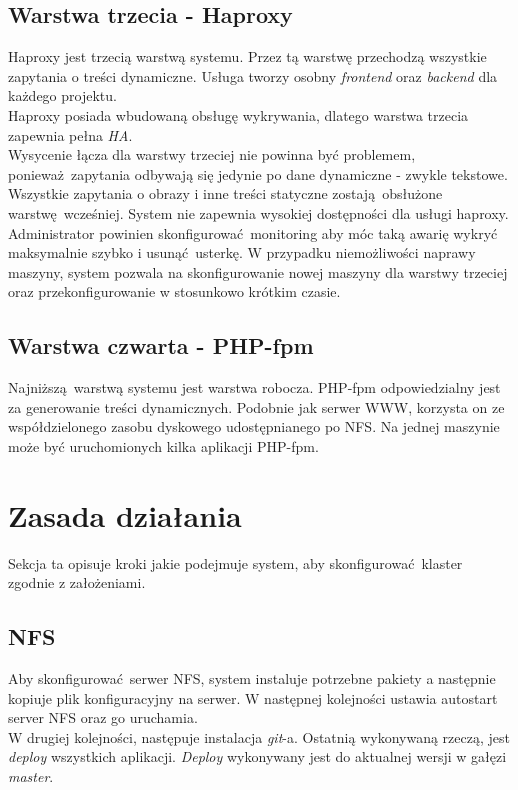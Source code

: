 \subsection{Warstwa trzecia - Haproxy}
Haproxy jest trzecią warstwą systemu.
Przez tą warstwę przechodzą wszystkie zapytania o treści dynamiczne.
Usługa tworzy osobny \textit{frontend} oraz \textit{backend} dla każdego projektu.\\
Haproxy posiada wbudowaną obsługę wykrywania, dlatego warstwa trzecia zapewnia pełna \textit{HA}.\\
Wysycenie łącza dla warstwy trzeciej nie powinna być problemem, ponieważ zapytania odbywają się jedynie po dane dynamiczne - zwykle tekstowe.
Wszystkie zapytania o obrazy i inne treści statyczne zostają obsłużone warstwę wcześniej.
System nie zapewnia wysokiej dostępności dla usługi haproxy.
Administrator powinien skonfigurować monitoring aby móc taką awarię wykryć maksymalnie szybko i usunąć usterkę.
W przypadku niemożliwości naprawy maszyny, system pozwala na skonfigurowanie nowej maszyny dla warstwy trzeciej oraz przekonfigurowanie w stosunkowo krótkim czasie.
\subsection{Warstwa czwarta - PHP-fpm}
Najniższą warstwą systemu jest warstwa robocza.
PHP-fpm odpowiedzialny jest za generowanie treści dynamicznych.
Podobnie jak serwer WWW, korzysta on ze współdzielonego zasobu dyskowego udostępnianego po NFS.
Na jednej maszynie może być uruchomionych kilka aplikacji PHP-fpm.
\section{Zasada działania}
Sekcja ta opisuje kroki jakie podejmuje system, aby skonfigurować klaster zgodnie z założeniami.
\subsection{NFS}
Aby skonfigurować serwer NFS, system instaluje potrzebne pakiety a następnie kopiuje plik konfiguracyjny na serwer.
W następnej kolejności ustawia autostart server NFS oraz go uruchamia.\\
W drugiej kolejności, następuje instalacja \textit{git}-a.
Ostatnią wykonywaną rzeczą, jest \textit{deploy} wszystkich aplikacji.
\textit{Deploy} wykonywany jest do aktualnej wersji w gałęzi \textit{master}.

